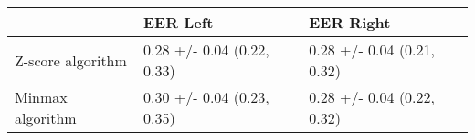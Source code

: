 \begin{tabular}{lll}
\toprule
{} &                    EER Left &                   EER Right \\
\midrule
Z-score algorithm &  0.28 +/- 0.04 (0.22, 0.33) &  0.28 +/- 0.04 (0.21, 0.32) \\
Minmax algorithm  &  0.30 +/- 0.04 (0.23, 0.35) &  0.28 +/- 0.04 (0.22, 0.32) \\
\bottomrule
\end{tabular}
